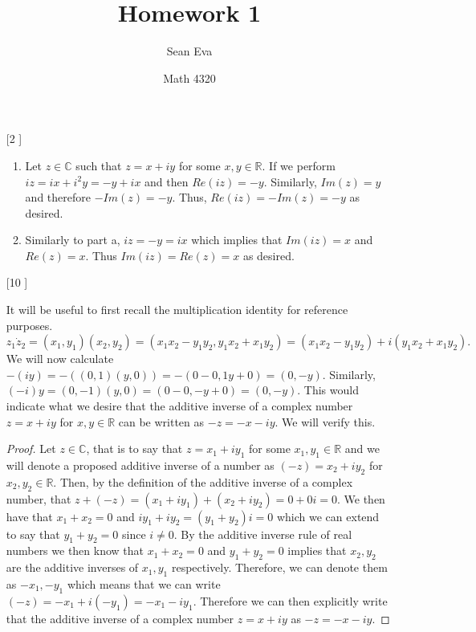 \documentclass{article}
\title{Homework 1}
\author{Sean Eva}
\date{Math 4320}
\theoremstyle{definition}
\newcommand{\C}{\mathbb{C}}
\newcommand{\R}{\mathbb{R}}
\begin{document}
\maketitle

\begin{enumerate}
    \item [[\phantom{-}2]]
    
    \begin{enumerate}
        \item 
        
        Let $z \in \C$ such that $z = x + iy$ for some $x, y\in \R$. If we perform $iz = ix + i^2y = -y + ix$ and then $Re(iz) = -y$. Similarly, $Im(z) = y$ and therefore $-Im(z)= -y$. Thus, $Re(iz) = -Im(z) = -y$ as desired.
        
        \item
        
        Similarly to part a, $iz = -y = ix$ which implies that $Im(iz) = x$ and $Re(z) = x$. Thus $Im(iz) = Re(z) = x$ as desired.
        
    \end{enumerate}
    
    \item [[\phantom{-}10]]
    
    It will be useful to first recall the multiplication identity for reference purposes. $z_1 \dot z_2 = (x_1, y_1)(x_2, y_2) = (x_1x_2 - y_1y_2, y_1x_2 + x_1y_2) = (x_1x_2 - y_1y_2) + i(y_1x_2 + x_1y_2).$ We will now calculate $-(iy) = -((0, 1)(y, 0)) = -(0 - 0, 1y + 0) = (0, -y)$. Similarly, $(-i)y = (0, -1)(y, 0) = (0 - 0, -y + 0) = (0, -y).$ This would indicate what we desire that the additive inverse of a complex number $z = x + iy$ for $x,y\in \R$ can be written as $-z = -x -iy$. We will verify this.
    \begin{proof}
    Let $z\in \C$, that is to say that $z = x_1 + iy_1$ for some $x_1, y_1\in \R$ and we will denote a proposed additive inverse of a number as $(-z) = x_2 + iy_2$ for $x_2, y_2\in \R$. Then, by the definition of the additive inverse of a complex number, that $z + (-z) = (x_1 + iy_1) + (x_2 + iy_2) = 0 + 0i = 0$. We then have that $x_1 + x_2 = 0$ and $iy_1 + iy_2 = (y_1 + y_2)i = 0$ which we can extend to say that $y_1 + y_2 = 0$ since $i \neq 0.$ By the additive inverse rule of real numbers we then know that $x_1 + x_2 = 0$ and $y_1 + y_2 = 0$ implies that $x_2, y_2$ are the additive inverses of $x_1, y_1$ respectively. Therefore, we can denote them as $-x_1, -y_1$ which means that we can write $(-z) = -x_1 + i(-y_1) = -x_1 -  iy_1$. Therefore we can then explicitly write that the additive inverse of a complex number $z = x + iy$ as $-z = -x - iy.$
    \end{proof}
    

\end{enumerate}
\end{document}
